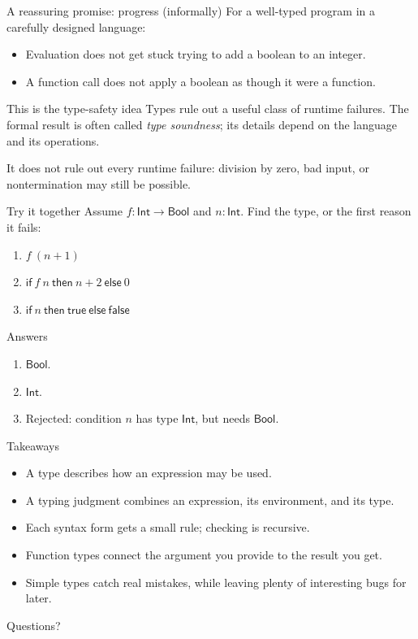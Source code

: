 \documentclass[aspectratio=169,11pt]{beamer}
\newcommand{\Bool}{\mathsf{Bool}}
\newcommand{\Int}{\mathsf{Int}}
\newcommand{\Arrow}{\mathbin{\to}}
\begin{document}
\begin{frame}{A reassuring promise: progress (informally)}
For a well-typed program in a carefully designed language:
\begin{itemize}
  \item Evaluation does not get stuck trying to add a boolean to an integer.
  \item A function call does not apply a boolean as though it were a function.
\end{itemize}
\begin{block}{This is the type-safety idea}
Types rule out a useful class of runtime failures. The formal result is often called \emph{type soundness}; its details depend on the language and its operations.
\end{block}
It does not rule out every runtime failure: division by zero, bad input, or nontermination may still be possible.
\end{frame}

\begin{frame}{Try it together}
Assume $f:\Int\Arrow\Bool$ and $n:\Int$. Find the type, or the first reason it fails:
\begin{enumerate}
  \item $f\ (n+1)$
  \item $\mathsf{if}\ f\ n\ \mathsf{then}\ n+2\ \mathsf{else}\ 0$
  \item $\mathsf{if}\ n\ \mathsf{then}\ \mathsf{true}\ \mathsf{else}\ \mathsf{false}$
\end{enumerate}
\pause
\begin{exampleblock}{Answers}
  \begin{enumerate}
    \item $\Bool$.
    \item $\Int$.
    \item Rejected: condition $n$ has type $\Int$, but needs $\Bool$.
  \end{enumerate}
\end{exampleblock}
\end{frame}

\begin{frame}{Takeaways}
\begin{itemize}
  \item A type describes how an expression may be used.
  \item A typing judgment combines an expression, its environment, and its type.
  \item Each syntax form gets a small rule; checking is recursive.
  \item Function types connect the argument you provide to the result you get.
  \item Simple types catch real mistakes, while leaving plenty of interesting bugs for later.
\end{itemize}
\bigskip
\centering\Large Questions?
\end{frame}
\end{document}
